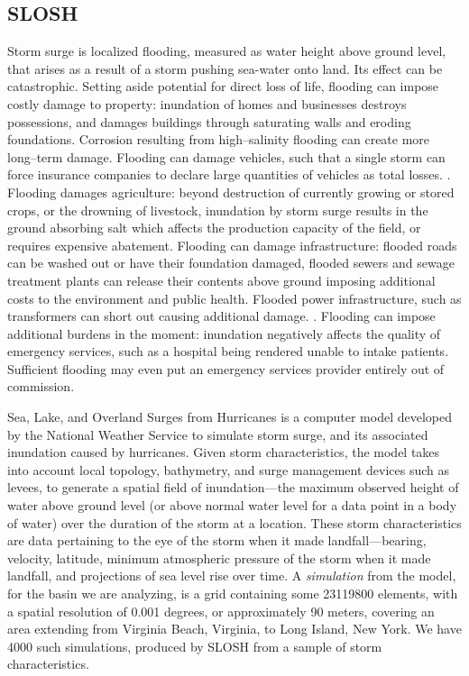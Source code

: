 \subsection{SLOSH}
Storm surge is localized flooding, measured as water height above
    ground level, that arises as a result of a storm pushing sea-water onto
    land. Its effect can be catastrophic.  Setting aside potential 
    for direct loss of life, 
    flooding can impose costly damage to property: inundation of homes and 
    businesses destroys possessions, and damages buildings through saturating 
    walls and eroding foundations.  Corrosion resulting from high--salinity 
    flooding can create more long--term damage.\needcite  
    Flooding can damage vehicles, such that a single storm can force insurance 
    companies to declare large quantities of vehicles as total losses. 
    \needcite.  Flooding damages agriculture: beyond 
    destruction of currently growing or stored crops, or the drowning of 
    livestock, inundation by storm surge results in the ground absorbing salt
    which affects the production capacity of the field, or requires expensive
    abatement.  Flooding can
    damage infrastructure: flooded roads can be washed out or have their 
    foundation damaged, flooded sewers and sewage treatment plants can release 
    their contents above ground imposing additional costs to the environment and
    public health. Flooded power infrastructure, such as transformers can short 
    out causing additional damage. \citep{hutchings2021}.  Flooding can impose 
    additional burdens in the moment:  inundation negatively affects the quality 
    of emergency services, such as a hospital being rendered unable to intake 
    patients.  Sufficient flooding may even put an emergency services provider 
    entirely out of commission.

Sea, Lake, and Overland Surges from Hurricanes \citep{jelesnianski1992} is a 
    computer model developed by the National Weather Service to simulate storm 
    surge, and its associated inundation caused by hurricanes.   Given storm 
    characteristics, the model takes into account local topology, bathymetry, 
    and surge management devices such as levees, to generate a spatial field of 
    inundation---the maximum observed height of water above ground level 
    (or above normal water level for a data point in a body of water) over the 
    duration of the storm at a location.   These storm characteristics are
    data pertaining to the eye of the storm when it made landfall---bearing, 
    velocity, latitude, minimum atmospheric pressure of the storm when it 
    made landfall, and projections of sea level rise over time.  A 
    \emph{simulation} from the model, for the basin we are analyzing, is a grid 
    containing some \num{23119800} elements, with a spatial resolution of 
    \num{0.001} degrees, or approximately 90 meters, covering an area extending 
    from Virginia Beach, Virginia, to Long Island, New York.
    We have \num{4000} such simulations, produced by SLOSH from a sample of 
    storm characteristics. 

